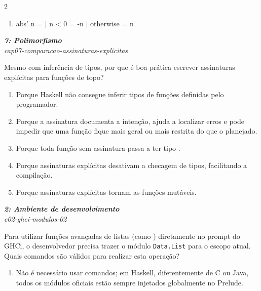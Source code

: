 \documentclass[a4paper,10pt,brazil]{article}
\begin{document}
\begin{multicols}{2}
\begin{enumerate}
  \item \begin{haskellcode}
abs' n =
  | n < 0     = -n
  | otherwise = n
\end{haskellcode}


\end{enumerate}

\begin{flushright}
  \footnotesize
  \textit{\textbf{7: Polimorfismo}}\\
  \textit{cap07-comparacao-assinaturas-explicitas}\\

\end{flushright}
Mesmo com inferência de tipos, por que é boa prática escrever assinaturas explícitas para funções de topo?
\begin{enumerate}
  \item Porque Haskell não consegue inferir tipos de funções definidas pelo programador.
  \item Porque a assinatura documenta a intenção, ajuda a localizar erros e pode impedir que uma função fique mais geral ou mais restrita do que o planejado.
  \item Porque toda função sem assinatura passa a ter tipo .
  \item Porque assinaturas explícitas desativam a checagem de tipos, facilitando a compilação.
  \item Porque assinaturas explícitas tornam as funções mutáveis.

\end{enumerate}

\begin{flushright}
  \footnotesize
  \textit{\textbf{2: Ambiente de desenvolvimento}}\\
  \textit{c02-ghci-modulos-02}\\

\end{flushright}
Para utilizar funções avançadas de listas (como ) diretamente no prompt do GHCi, o desenvolvedor precisa trazer o módulo \texttt{Data.List} para o escopo atual. Quais comandos são válidos para realizar esta operação?

\begin{enumerate}
  \item Não é necessário usar comandos; em Haskell, diferentemente de C ou Java, todos os módulos oficiais estão sempre injetados globalmente no Prelude.


\end{enumerate}
\end{multicols}
\end{document}
